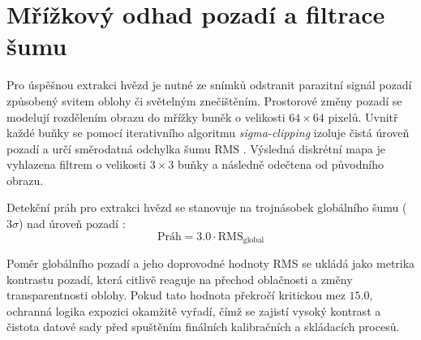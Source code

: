 \section{Mřížkový odhad pozadí a filtrace šumu}
Pro úspěšnou extrakci hvězd je nutné ze snímků odstranit parazitní signál pozadí způsobený svitem oblohy či světelným znečištěním. Prostorové změny pozadí se modelují rozdělením obrazu do mřížky buněk o velikosti $64 \times 64$ pixelů. Uvnitř každé buňky se pomocí iterativního algoritmu \textit{sigma-clipping} izoluje čistá úroveň pozadí a určí směrodatná odchylka šumu \ac{RMS} \cite{sextractor, popowicz}. Výsledná diskrétní mapa je vyhlazena filtrem o velikosti $3 \times 3$ buňky a následně odečtena od původního obrazu.

Detekční práh pro extrakci hvězd se stanovuje na trojnásobek globálního šumu ($3\sigma$) nad úroveň pozadí \cite{sextractor}:
\begin{equation}
\text{Práh} = 3.0 \cdot \text{RMS}_{\text{global}}
\end{equation}


Poměr globálního pozadí a jeho doprovodné hodnoty \ac{RMS} se ukládá jako metrika kontrastu pozadí, která citlivě reaguje na přechod oblačnosti a změny transparentnosti oblohy. Pokud tato hodnota překročí kritickou mez $15.0$, ochranná logika expozici okamžitě vyřadí, čímž se zajistí vysoký kontrast a čistota datové sady před spuštěním finálních kalibračních a skládacích procesů.